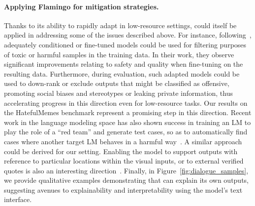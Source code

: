 \paragraph{Applying Flamingo for mitigation strategies.}
Thanks to its ability to rapidly adapt in low-resource settings, \largem{} could itself be applied in addressing some of the issues described above.
For instance, following~\citet{thoppilan2022lamda}, adequately conditioned or fine-tuned \method{} models could be used for filtering purposes of toxic or harmful samples in the training data.
In their work, they observe significant improvements relating to safety and quality when fine-tuning on the resulting data.
Furthermore, during evaluation, such adapted models could be used to down-rank or exclude outputs that might be classified as offensive, promoting social biases and stereotypes or leaking private information, thus accelerating progress in this direction even for low-resource tasks.
Our results on the HatefulMemes benchmark represent a promising step in this direction.
Recent work in the language modeling space has also shown success in training an LM to play the role of a ``red team'' and generate test cases, so as to automatically find cases where another target LM behaves in a harmful way~\citep{perez2022red}. 
A similar approach could be derived for our setting.
Enabling the model to support outputs with reference to particular locations within the visual inputs, or to external verified quotes is also an interesting direction~\citep{menick2022teaching,thoppilan2022lamda}.
Finally, in Figure~\ref{fig:dialogue_samples}, we provide qualitative examples demonstrating that \method{} can explain its own outputs, suggesting avenues to explainability and interpretability using the model's text interface.